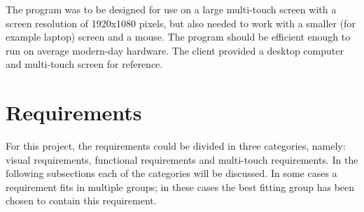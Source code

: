 The program was to be designed for use on a large multi-touch screen with a screen resolution of 1920x1080 pixels, but also needed to work with a smaller (for example laptop) screen and a mouse. The program should be efficient enough to run on average modern-day hardware. The client provided a desktop computer and multi-touch screen for reference.

\section{Requirements}

For this project, the requirements could be divided in three categories, namely: visual requirements, functional requirements and multi-touch requirements. In the following subsections each of the categories will be discussed. In some cases a requirement fits in multiple groups; in these cases the best fitting group has been chosen to contain this requirement.

